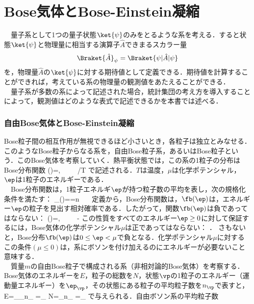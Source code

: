 \part{Bose気体とBose-Einstein凝縮}
　量子系として1つの量子状態$\ket{\psi}$のみをとるような系を考える．すると状態$\ket{\psi}$と物理量に相当する演算子$\hat{A}$できまるスカラー量
\begin{align}
\label{ev}
\Braket{\hat{A}}_{\psi}=\Braket{\psi|\hat{A}|\psi}
\end{align}
を，物理量$\hat{A}$の$\ket{\psi}$に対する期待値として定義できる．期待値を計算することができれば，考えている系の物理量の観測値をあたえることができる．\\
　量子系が多数の系によって記述された場合，統計集団の考え方を導入することによって，観測値はどのような表式で記述できるかを本書では述べる．






\section{自由Bose気体とBose-Einstein凝縮}
Bose粒子間の相互作用が無視できるほど小さいとき，各粒子は独立とみなせる．このようなBose粒子からなる系を，自由Bose粒子系，あるいはBose粒子という．このBose気体を考察していく．熱平衡状態では，この系の1粒子の分布はBose分布関数
\be\label{bdf}
\fb(\ep)=,\ \ \ \ \ /\kb T
\ee
で記述される．$T$は温度，$\mu$は化学ポテンシャル，$\ep$は1粒子のエネルギーである．\\
　Bose分布関数は，1粒子エネルギ$\ep$が持つ粒子数の平均を表し，次の規格化条件を満たす：
\be
{}\displaystyle\sum_{\ep}\fb(\ep)==n\ 
\ee
　定義から，Bose分布関数は，$\fb(\ep)$は，エネルギー$\ep$の粒子を見出す相対確率である．したがって，関数$\fb(\ep)$は負であってはならない：
\be\label{bdf1}
\fb(\ep)=,\ \ \ \ \ \therefore\ep-\mu{}
\ee
この性質をすべてのエネルギー$\ep\geq0$に対して保証するには，Bose気体の化学ポテンシャル$\mu$は正であってはならない：
\be\label{mu0}
．
\ee
さもないと，Bose分布$\fb(\ep)$は$0\leq\ep<\mu$で負となる．化学ポテンシャル$\mu$に対するこの条件$(\mu\leq0)$は，系にボソンを付け加えるのにエネルギーが必要ないこと意味する．\\
%
　質量$m$の自由Bose粒子で構成される系（非相対論的Bose気体）を考察する．Bose気体のエネルギーを$E$，粒子の総数を$N$，状態$\vp$の1粒子のエネルギー（運動量エネルギー）を$\ep_{\vp}$，その状態にある粒子の平均粒子数を$n_{\vp}$で表すと，
\be\label{e}
E=\displaystyle\sum_{\vp}\ep_{\vp}n_{\vp}
=\displaystyle\sum_{\vp}
\ee
\be\label{n}
N=\displaystyle\sum_{\vp}n_{\vp}
=\displaystyle\sum_{\vp}
\ee
で与えられる．自由ボソン系の平均粒子数
























